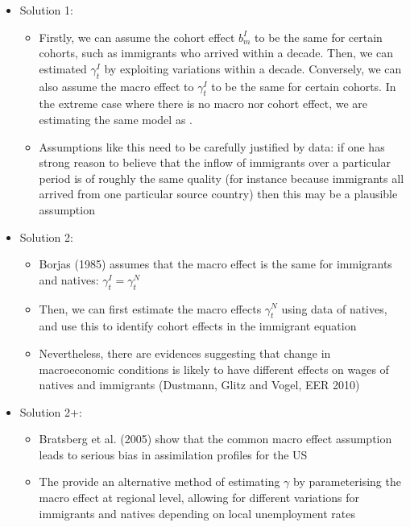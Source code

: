             \begin{itemize}
                \item Solution 1: 
                    \begin{itemize}
                        \item Firstly, we can assume the cohort effect $b^I_{m}$ to be the same for certain cohorts, such as  immigrants who arrived within a decade. Then, we can estimated $\gamma_{t}^I$ by exploiting variations within a decade. Conversely, we can also assume the macro effect to $\gamma_{t}^I$ to be the same for certain cohorts. In the extreme case where there is no macro nor cohort effect, we are estimating the same model as \cite{chiswick_effect_1978}.
                        \item Assumptions like this need to be carefully justified by data: if one has strong reason to believe that the inflow of immigrants over a particular period is of roughly the same quality (for instance because immigrants all arrived from one particular source country) then this may be a plausible assumption
                    \end{itemize}
                \item Solution 2: 
                    \begin{itemize}
                        \item Borjas (1985) assumes that the macro effect is the same for immigrants and natives: $\gamma_{t}^I=\gamma_{t}^N$
                        \item Then, we can first estimate the macro effects $\gamma_{t}^N$ using data of natives, and use this to identify cohort effects in the immigrant equation
                        \item Nevertheless, there are evidences suggesting that change in macroeconomic conditions is likely to have different effects on wages of natives and immigrants (Dustmann, Glitz and Vogel, EER 2010)
                    \end{itemize}
                \item Solution 2+: 
                    \begin{itemize}
                        \item Bratsberg et al. (2005) show that the common macro effect assumption leads to serious bias in assimilation profiles for the US
                        \item The provide an alternative method of estimating $\gamma$ by parameterising the macro effect at regional level, allowing for different variations for immigrants and natives depending on local unemployment rates
                    \end{itemize}
            \end{itemize}


